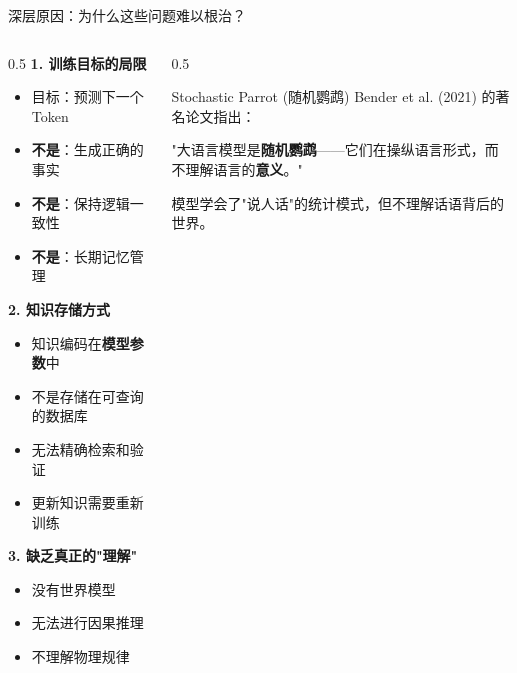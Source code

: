 \documentclass[aspectratio=169,11pt]{beamer}
\begin{document}
\begin{frame}{深层原因：为什么这些问题难以根治？}
    \begin{columns}
        \begin{column}{0.5\textwidth}
            \textbf{1. 训练目标的局限}
            \begin{itemize}
                \item 目标：预测下一个Token
                \item \textbf{不是}：生成正确的事实
                \item \textbf{不是}：保持逻辑一致性
                \item \textbf{不是}：长期记忆管理
            \end{itemize}
            
            \vspace{0.3cm}
            \textbf{2. 知识存储方式}
            \begin{itemize}
                \item 知识编码在\textbf{模型参数}中
                \item 不是存储在可查询的数据库
                \item 无法精确检索和验证
                \item 更新知识需要重新训练
            \end{itemize}
            
            \vspace{0.3cm}
            \textbf{3. 缺乏真正的"理解"}
            \begin{itemize}
                \item 没有世界模型
                \item 无法进行因果推理
                \item 不理解物理规律
            \end{itemize}
        \end{column}
        \begin{column}{0.5\textwidth}
            \begin{alertblock}{Stochastic Parrot (随机鹦鹉)}
                \small
                Bender et al. (2021) 的著名论文指出：
                
                \vspace{0.2cm}
                "大语言模型是\textbf{随机鹦鹉}——它们在操纵语言形式，而不理解语言的\textbf{意义}。"
                
                \vspace{0.2cm}
                模型学会了"说人话"的统计模式，但不理解话语背后的世界。
            \end{alertblock}
            

\end{column}
\end{columns}
\end{frame}
\end{document}
